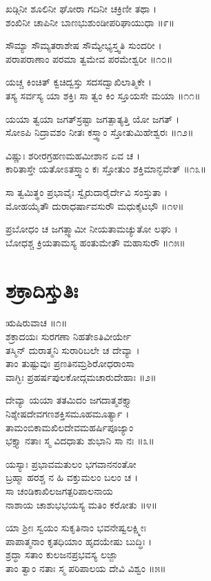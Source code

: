 ಖಡ್ಗಿನೀ ಶೂಲಿನೀ ಘೋರಾ ಗದಿನೀ ಚಕ್ರಿಣೀ ತಥಾ ।\\
ಶಂಖಿನೀ ಚಾಪಿನೀ ಬಾಣಭುಶುಂಡೀಪರಿಘಾಯುಧಾ ॥೯॥

ಸೌಮ್ಯಾ ಸೌಮ್ಯತರಾಶೇಷ ಸೌಮ್ಯೇಭ್ಯಸ್ತ್ವತಿ ಸುಂದರೀ ।\\
ಪರಾಪರಾಣಾಂ ಪರಮಾ ತ್ವಮೇವ ಪರಮೇಶ್ವರೀ ॥೧೦॥

ಯಚ್ಚ ಕಿಂಚಿತ್ ಕ್ವಚಿದ್ವಸ್ತು ಸದಸದ್ವಾಖಿಲಾತ್ಮಿಕೇ ।\\
ತಸ್ಯ ಸರ್ವಸ್ಯ ಯಾ ಶಕ್ತಿಃ ಸಾ ತ್ವಂ ಕಿಂ ಸ್ತೂಯಸೇ ಮಯಾ ॥೧೧॥

ಯಯಾ ತ್ವಯಾ ಜಗತ್‌ಸ್ರಷ್ಟಾ ಜಗತ್ಪಾತ್ಯತ್ತಿ ಯೋ ಜಗತ್ ।\\
ಸೋಽಪಿ ನಿದ್ರಾವಶಂ ನೀತಃ ಕಸ್ತ್ವಾಂ ಸ್ತೋತುಮಿಹೇಶ್ವರಃ ॥೧೨॥

ವಿಷ್ಣುಃ ಶರೀರಗ್ರಹಣಮಹಮೀಶಾನ ಏವ ಚ ।\\
ಕಾರಿತಾಸ್ತೇ ಯತೋಽತಸ್ತ್ವಾಂ ಕಃ ಸ್ತೋತುಂ ಶಕ್ತಿಮಾನ್ಭವೇತ್ ॥೧೩॥

ಸಾ ತ್ವಮಿತ್ಥಂ ಪ್ರಭಾವೈಃ ಸ್ವೈರುದಾರೈರ್ದೇವಿ ಸಂಸ್ತುತಾ ।\\
ಮೋಹಯೈತೌ ದುರಾಧರ್ಷಾವಸುರೌ ಮಧುಕೈಟಭೌ ॥೧೪॥

ಪ್ರಬೋಧಂ ಚ ಜಗತ್ಸ್ವಾಮೀ ನೀಯತಾಮಚ್ಯುತೋ ಲಘು ।\\
ಬೋಧಶ್ಚ ಕ್ರಿಯತಾಮಸ್ಯ ಹಂತುಮೇತೌ ಮಹಾಸುರೌ ॥೧೫॥


\section{ಶಕ್ರಾದಿಸ್ತುತಿಃ}
          ಋಷಿರುವಾಚ ॥೧॥\\
     ಶಕ್ರಾದಯಃ ಸುರಗಣಾ ನಿಹತೇಽತಿವೀರ್ಯೇ\\
ತಸ್ಮಿನ್ ದುರಾತ್ಮನಿ ಸುರಾರಿಬಲೇ ಚ ದೇವ್ಯಾ ।\\
     ತಾಂ ತುಷ್ಟುವುಃ ಪ್ರಣತಿನಮ್ರಶಿರೋಧರಾಂಸಾ\\
ವಾಗ್ಭಿಃ ಪ್ರಹರ್ಷಪುಲಕೋದ್ಗಮಚಾರುದೇಹಾಃ ॥೨॥

     ದೇವ್ಯಾ ಯಯಾ ತತಮಿದಂ ಜಗದಾತ್ಮಶಕ್ತ್ಯಾ\\
ನಿಶ್ಶೇಷದೇವಗಣಶಕ್ತಿಸಮೂಹಮೂರ್ತ್ಯಾ ।\\
     ತಾಮಂಬಿಕಾಮಖಿಲದೇವಮಹರ್ಷಿಪೂಜ್ಯಾಂ\\
ಭಕ್ತ್ಯಾ ನತಾಃ ಸ್ಮ ವಿದಧಾತು ಶುಭಾನಿ ಸಾ ನಃ ॥೩॥

     ಯಸ್ಯಾಃ ಪ್ರಭಾವಮತುಲಂ ಭಗವಾನನಂತೋ\\
ಬ್ರಹ್ಮಾ ಹರಶ್ಚ ನ ಹಿ ವಕ್ತುಮಲಂ ಬಲಂ ಚ ।\\
     ಸಾ ಚಂಡಿಕಾಖಿಲಜಗತ್ಪರಿಪಾಲನಾಯ\\
ನಾಶಾಯ ಚಾಶುಭಭಯಸ್ಯ ಮತಿಂ ಕರೋತು ॥೪॥

     ಯಾ ಶ್ರೀಃ ಸ್ವಯಂ ಸುಕೃತಿನಾಂ ಭವನೇಷ್ವಲಕ್ಷ್ಮೀಃ\\
ಪಾಪಾತ್ಮನಾಂ ಕೃತಧಿಯಾಂ ಹೃದಯೇಷು ಬುದ್ಧಿಃ ।\\
     ಶ್ರದ್ಧಾ ಸತಾಂ ಕುಲಜನಪ್ರಭವಸ್ಯ ಲಜ್ಜಾ\\
ತಾಂ ತ್ವಾಂ ನತಾಃ ಸ್ಮ ಪರಿಪಾಲಯ ದೇವಿ ವಿಶ್ವಂ ॥೫॥

